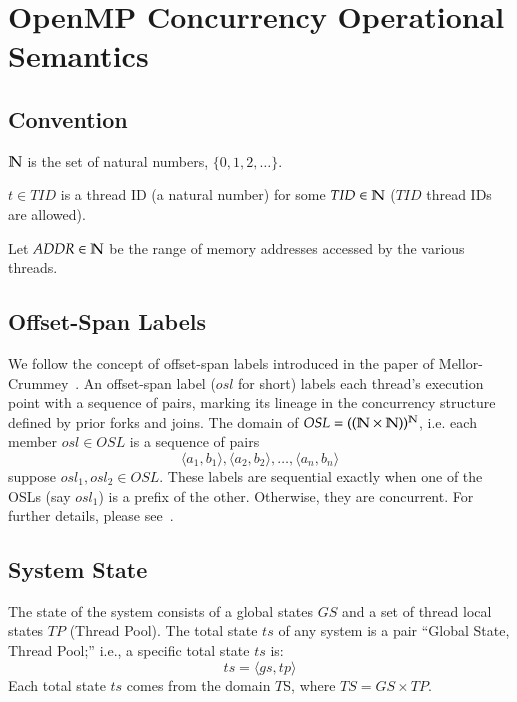 \section{OpenMP Concurrency Operational Semantics}
\label{sec:appendixa}

\subsection{Convention}
\label{subsec:convention}

\begin{compactitem}
\item $\mathbb{N}$ is the set of natural numbers, $\{0,1,2,\ldots\}$.
\item $t\in TID$ is a thread ID (a natural number) for some $TID\in \mathbb{N}$ ($TID$
  thread IDs are allowed).
\item Let $ADDR\in\mathbb{N}$ be the range of memory addresses accessed by the various
  threads.
\end{compactitem}

\subsection{Offset-Span Labels}
\label{subsec:osl}

We follow the concept of offset-span labels introduced in the paper of
Mellor-Crummey~\cite{Mellor-Crummey:1991:ODD:125826.125861}.
%
An offset-span label ($osl$ for short) labels each thread's execution point
with a sequence of pairs, marking its lineage in the concurrency structure
defined by prior forks and joins.
%
The domain of $OSL = ((\mathbb{N}\times\mathbb{N}))^{\mathbb{N}}$, i.e. each member $osl\in OSL$ is a
sequence of pairs
\[ \langle a_1,b_1\rangle, \langle a_2,b_2\rangle,\ldots,\langle
a_n,b_n\rangle\] suppose $osl_1, osl_2\in OSL$.
%
These labels are sequential exactly when one of the OSLs (say $osl_1$) is a
prefix of the other.
%
Otherwise, they are concurrent.
%
For further details, please see~\cite{Mellor-Crummey:1991:ODD:125826.125861}.

\subsection{System State}
\label{subsec:systemstate}

The state of the system consists of a global states $GS$ and a set of thread
local states $TP$ (Thread Pool).
%
The total state $ts$ of any system is a pair ``Global State, Thread Pool;''
i.e., a specific total state $ts$ is:
\[ ts = \langle gs, tp \rangle \]
\noindent Each total state $ts$ comes from the domain $T$S, where
$TS = GS\times TP$.

